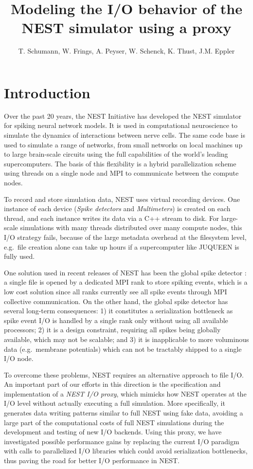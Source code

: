 \documentclass[]{YIC2015}
\title{Modeling the I/O behavior of the NEST simulator using a proxy}
\author[T. Schumann et al.]{%
  T. Schumann\authref{a}\corref,
  W. Frings\authref{b},
  A. Peyser\authref{c},
  W. Schenck\authref{c},
  K. Thust\authref{b},
  J.M. Eppler\authref{c}
}
\begin{document}
\maketitle

\section{Introduction}
%
Over the past 20 years, the NEST Initiative \cite{NESTInitiative} has
developed the NEST simulator \cite{NEST} for spiking neural network
models. It is used in computational neuroscience to simulate the
dynamics of interactions between nerve cells. The same code base is
used to simulate a range of networks, from small networks on local
machines up to large brain-scale circuits using the full capabilities
of the world's leading supercomputers. The basis of this flexibility
is a hybrid parallelization scheme using threads on a single node and
MPI \cite{mpi} to communicate between the compute nodes.

To record and store simulation data, NEST uses virtual recording
devices. One instance of each device (\emph{Spike detectors}
and \emph{Multimeters}) is created on each thread, and each instance
writes its data via a C++ stream to disk. For large-scale simulations
with many threads distributed over many compute nodes, this I/O
strategy fails, because of the large metadata overhead at the
filesystem level, e.g.~file creation alone can take up hours if a
supercomputer like JUQUEEN is fully used.

One solution used in recent releases of NEST has been the global spike
detector \cite{gsd}: a single file is opened by a dedicated MPI rank to
store spiking events, which is a low cost solution since all ranks
currently see all spike events through MPI collective communication.
On the other hand, the global spike detector has several long-term
consequences: 1) it constitutes a serialization bottleneck as spike
event I/O is handled by a single rank only without using all available
processors; 2) it is a design constraint, requiring all spikes being
globally available, which may not be scalable; and 3) it is
inapplicable to more voluminous data (e.g.~membrane potentials) which
can not be tractably shipped to a single I/O node.

To overcome these problems, NEST requires an alternative approach to
file I/O. An important part of our efforts in this direction is the
specification and implementation of a \emph{NEST I/O proxy}, which
mimicks how NEST operates at the I/O level without actually executing
a full simulation. More specifically, it generates data writing
patterns similar to full NEST using fake data, avoiding a large part
of the computational costs of full NEST simulations during the
development and testing of new I/O backends. Using this proxy, we
have investigated possible performance gains by replacing the current I/O
paradigm with calls to parallelized I/O libraries which could avoid
serialization bottlenecks, thus paving the road for better I/O
performance in NEST.
\end{document}
